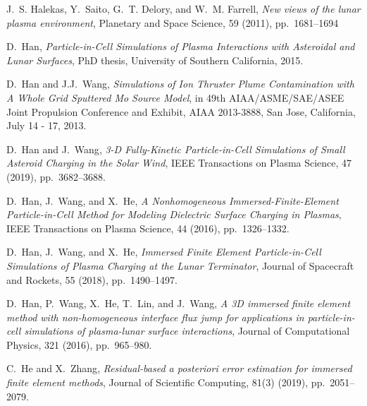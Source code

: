 \documentclass{siamart171218}
\begin{document}
\begin{thebibliography}{99}
{\sc J.~S. Halekas, Y.~Saito, G.~T. Delory, and W.~M. Farrell}, {\em New views
  of the lunar plasma environment}, Planetary and Space Science, 59 (2011),
  pp.~1681--1694

{\sc D.~Han}, {\em Particle-in-Cell Simulations of Plasma Interactions with
  Asteroidal and Lunar Surfaces}, PhD thesis, University of Southern
  California, 2015.
  
{\sc D.~Han and J.J.~Wang}, {\em
  \textnormal{{S}imulations of {I}on {T}hruster {P}lume {C}ontamination with
  {A} {W}hole {G}rid {S}puttered {M}o {S}ource {M}odel}}, in 49th
  AIAA/ASME/SAE/ASEE Joint Propulsion Conference and Exhibit, AIAA 2013-3888,
  San Jose, California, July 14 - 17, 2013.

{\sc D.~Han and J.~Wang}, {\em {3-{D} {F}ully-{K}inetic {P}article-in-{C}ell
  {S}imulations of {S}mall {A}steroid {C}harging in the {S}olar {W}ind}}, IEEE
  Transactions on Plasma Science, 47 (2019), pp.~3682--3688.

{\sc D.~Han, J.~Wang, and X.~He}, {\em {\mbox{A} Nonhomogeneous
  Immersed-Finite-Element Particle-in-Cell Method for Modeling Dielectric
  Surface Charging in Plasmas}}, IEEE Transactions on Plasma Science, 44
  (2016), pp.~1326--1332.

{\sc D.~Han, J.~Wang, and X.~He}, {\em { {I}mmersed {F}inite {E}lement
  {P}article-in-{C}ell {S}imulations of {P}lasma {C}harging at the {L}unar
  {T}erminator}}, Journal of Spacecraft and Rockets, 55 (2018), pp.~1490--1497.

{\sc D.~Han, P.~Wang, X.~He, T.~Lin, and J.~Wang}, {\em {\mbox{A} 3D immersed
  finite element method with non-homogeneous interface flux jump for
  applications in particle-in-cell simulations of plasma-lunar surface
  interactions}}, Journal of Computational Physics, 321 (2016), pp.~965--980.

{\sc C.~He and X.~Zhang}, {\em {Residual-based a posteriori error estimation
  for immersed finite element methods}}, Journal of Scientific Computing,
  81(3) (2019), pp.~2051--2079.


\end{thebibliography}
\end{document}

